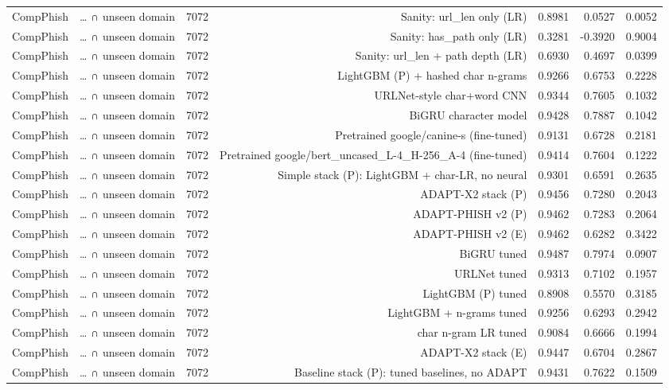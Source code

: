 \begin{table}[t]
\begin{tabular}{llrrrrr}
CompPhish & … ∩ unseen domain & 7072 & Sanity: url\_len only (LR) & 0.8981 & 0.0527 & 0.0052 \\
CompPhish & … ∩ unseen domain & 7072 & Sanity: has\_path only (LR) & 0.3281 & -0.3920 & 0.9004 \\
CompPhish & … ∩ unseen domain & 7072 & Sanity: url\_len + path depth (LR) & 0.6930 & 0.4697 & 0.0399 \\
CompPhish & … ∩ unseen domain & 7072 & LightGBM (P) + hashed char n-grams & 0.9266 & 0.6753 & 0.2228 \\
CompPhish & … ∩ unseen domain & 7072 & URLNet-style char+word CNN & 0.9344 & 0.7605 & 0.1032 \\
CompPhish & … ∩ unseen domain & 7072 & BiGRU character model & 0.9428 & 0.7887 & 0.1042 \\
CompPhish & … ∩ unseen domain & 7072 & Pretrained google/canine-s (fine-tuned) & 0.9131 & 0.6728 & 0.2181 \\
CompPhish & … ∩ unseen domain & 7072 & Pretrained google/bert\_uncased\_L-4\_H-256\_A-4 (fine-tuned) & 0.9414 & 0.7604 & 0.1222 \\
CompPhish & … ∩ unseen domain & 7072 & Simple stack (P): LightGBM + char-LR, no neural & 0.9301 & 0.6591 & 0.2635 \\
CompPhish & … ∩ unseen domain & 7072 & ADAPT-X2 stack (P) & 0.9456 & 0.7280 & 0.2043 \\
CompPhish & … ∩ unseen domain & 7072 & ADAPT-PHISH v2 (P) & 0.9462 & 0.7283 & 0.2064 \\
CompPhish & … ∩ unseen domain & 7072 & ADAPT-PHISH v2 (E) & 0.9462 & 0.6282 & 0.3422 \\
CompPhish & … ∩ unseen domain & 7072 & BiGRU tuned & 0.9487 & 0.7974 & 0.0907 \\
CompPhish & … ∩ unseen domain & 7072 & URLNet tuned & 0.9313 & 0.7102 & 0.1957 \\
CompPhish & … ∩ unseen domain & 7072 & LightGBM (P) tuned & 0.8908 & 0.5570 & 0.3185 \\
CompPhish & … ∩ unseen domain & 7072 & LightGBM + n-grams tuned & 0.9256 & 0.6293 & 0.2942 \\
CompPhish & … ∩ unseen domain & 7072 & char n-gram LR tuned & 0.9084 & 0.6666 & 0.1994 \\
CompPhish & … ∩ unseen domain & 7072 & ADAPT-X2 stack (E) & 0.9447 & 0.6704 & 0.2867 \\
CompPhish & … ∩ unseen domain & 7072 & Baseline stack (P): tuned baselines, no ADAPT & 0.9431 & 0.7622 & 0.1509 \\

\end{tabular}
\end{table}
